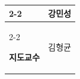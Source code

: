 \begin{titlepage}
\begin{center}
\begin{tabular}{|m{2cm}|m{6cm}|}
            \cline{2-2}

            &
            \centering 강민성\tabularnewline

            \cline{2-2}
            \hline

            \centering \textbf{지도교수}
            &
            \centering 김형균
            \tabularnewline
            \hline

        \end{tabular}

    \end{center}
    \restoregeometry
    \clearpage
\end{titlepage}